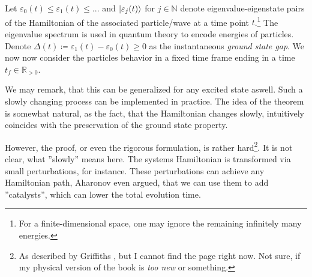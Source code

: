 \documentclass[10pt]{amsart}
\theoremstyle{definition}
\theoremstyle{remark}
\begin{document}
    Let \(\varepsilon_0(t) \leq \varepsilon_1(t) \leq ...\) and \(\ket{\varepsilon_j(t)}\) for \(j \in \mathbb{N}\) denote eigenvalue-eigenstate pairs of the Hamiltonian of the associated particle/wave at a time point \(t\).\footnote{For a finite-dimensional space, one may ignore the remaining infinitely many energies.} The eigenvalue spectrum is used in quantum theory to encode energies of particles. Denote \(\Delta(t) \coloneqq \varepsilon_1(t) - \varepsilon_0(t) \geq 0\) as the instantaneous \emph{ground state gap}. We now now consider the particles behavior in a fixed time frame ending in a time \(t_f \in \mathbb{R}_{> 0}\).
    
    \phantom{}

    
    \phantom{}

    We may remark, that this can be generalized for any excited state aswell. Such a slowly changing process can be implemented in practice. The idea of the theorem is somewhat natural, as the fact, that the Hamiltonian changes slowly, intuitively coincides with the preservation of the ground state property.
    
    However, the proof, or even the rigorous formulation, is rather hard\footnote{As described by Griffiths \cite{Griffiths}, but I cannot find the page right now. Not sure, if my physical version of the book is \emph{too new} or something.}. It is not clear, what ''slowly'' means here. The systems Hamiltonian is transformed via small perturbations, for instance. These perturbations can achieve any Hamiltonian path, Aharonov \cite[pp. 51-52]{Albash2016} even argued, that we can use them to add ''catalysts'', which can lower the total evolution time.

    \phantom{}
    \begin{minipage}{\linewidth}
        \centering
    \end{minipage}
\end{document}
